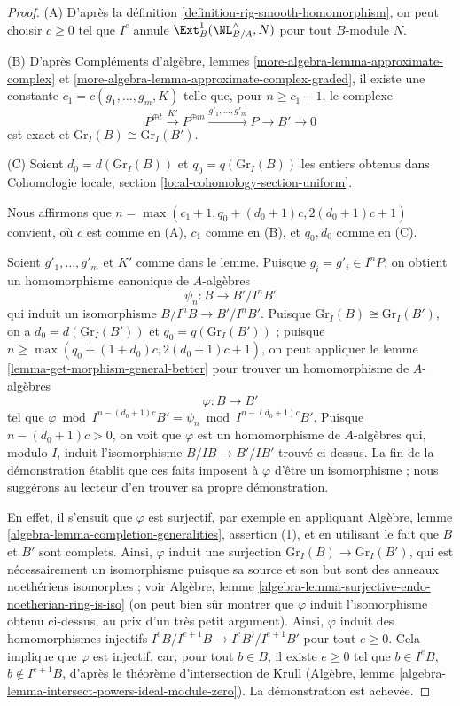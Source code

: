 \begin{proof}
(A) D'après la définition \ref{definition-rig-smooth-homomorphism}, on peut
choisir $c \geq 0$ tel que $I^c$ annule
$\Ext^1_B(\NL_{B/A}^\wedge, N)$ pour tout $B$-module $N$.

\medskip\noindent
(B) D'après Compléments d'algèbre, lemmes
\ref{more-algebra-lemma-approximate-complex} et
\ref{more-algebra-lemma-approximate-complex-graded}, il existe une constante
$c_1 = c(g_1, \ldots, g_m, K)$ telle que, pour $n \geq c_1 + 1$, le complexe
$$
P^{\oplus t} \xrightarrow{K'} P^{\oplus m}
\xrightarrow{g'_1, \ldots, g'_m} P \to B' \to 0
$$
est exact et $\text{Gr}_I(B) \cong \text{Gr}_I(B')$.

\medskip\noindent
(C) Soient $d_0 = d(\text{Gr}_I(B))$ et $q_0 = q(\text{Gr}_I(B))$ les entiers
obtenus dans Cohomologie locale, section
\ref{local-cohomology-section-uniform}.

\medskip\noindent
Nous affirmons que
$n = \max(c_1 + 1, q_0 + (d_0 + 1)c, 2(d_0 + 1)c + 1)$ convient, où $c$ est
comme en (A), $c_1$ comme en (B), et $q_0, d_0$ comme en (C).

\medskip\noindent
Soient $g'_1, \ldots, g'_m$ et $K'$ comme dans le lemme. Puisque
$g_i = g'_i \in I^nP$, on obtient un homomorphisme canonique de $A$-algèbres
$$
\psi_n : B \longrightarrow B'/I^nB'
$$
qui induit un isomorphisme $B/I^nB \to B'/I^nB'$. Puisque
$\text{Gr}_I(B) \cong \text{Gr}_I(B')$, on a
$d_0 = d(\text{Gr}_I(B'))$ et $q_0 = q(\text{Gr}_I(B'))$ ; puisque
$n \geq \max(q_0 + (1 + d_0)c, 2(d_0 + 1)c + 1)$, on peut appliquer le lemme
\ref{lemma-get-morphism-general-better} pour trouver un homomorphisme de
$A$-algèbres
$$
\varphi : B \longrightarrow B'
$$
tel que
$\varphi \bmod I^{n - (d_0 + 1)c}B' = \psi_n \bmod I^{n - (d_0 + 1)c}B'$.
Puisque $n - (d_0 + 1)c > 0$, on voit que $\varphi$ est un homomorphisme de
$A$-algèbres qui, modulo $I$, induit l'isomorphisme $B/IB \to B'/IB'$ trouvé
ci-dessus. La fin de la démonstration établit que ces faits imposent à
$\varphi$ d'être un isomorphisme ; nous suggérons au lecteur d'en trouver sa
propre démonstration.

\medskip\noindent
En effet, il s'ensuit que $\varphi$ est surjectif, par exemple en appliquant
Algèbre, lemme \ref{algebra-lemma-completion-generalities}, assertion (1), et
en utilisant le fait que $B$ et $B'$ sont complets. Ainsi, $\varphi$ induit
une surjection $\text{Gr}_I(B) \to \text{Gr}_I(B')$, qui est nécessairement
un isomorphisme puisque sa source et son but sont des anneaux noethériens
isomorphes ; voir Algèbre, lemme
\ref{algebra-lemma-surjective-endo-noetherian-ring-is-iso} (on peut bien sûr
montrer que $\varphi$ induit l'isomorphisme obtenu ci-dessus, au prix d'un très
petit argument). Ainsi, $\varphi$ induit des homomorphismes injectifs
$I^eB/I^{e + 1}B \to I^eB'/I^{e + 1}B'$ pour tout $e \geq 0$. Cela implique
que $\varphi$ est injectif, car, pour tout $b \in B$, il existe
$e \geq 0$ tel que $b \in I^eB$, $b \not \in I^{e + 1}B$, d'après le
théorème d'intersection de Krull (Algèbre, lemme
\ref{algebra-lemma-intersect-powers-ideal-module-zero}). La démonstration est
achevée.
\end{proof}

